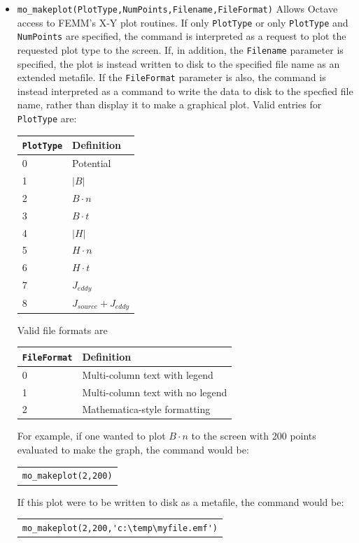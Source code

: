 \begin{itemize}
\item \verb+mo_makeplot(PlotType,NumPoints,Filename,FileFormat)+
Allows Octave access to FEMM's X-Y plot routines.  If only {\tt PlotType} or only {\tt PlotType}
and {\tt NumPoints} are specified, the command is interpreted as a request to plot the
requested plot type to the screen.  If, in addition, the {\tt Filename} parameter is specified,
the plot is instead written to disk to the specified file name as an extended metafile.
If the {\tt FileFormat} parameter is also, the command is instead interpreted as a command to
write the data to disk to the specfied file name, rather than display it to make a
graphical plot.
Valid entries for {\tt PlotType} are:
\begin{center}
\begin{tabular}{ll} \hline
{\tt PlotType} & Definition \\ \hline
0 & Potential \\
1 & $|B|$ \\
2 & $B \cdot n$ \\
3 & $B \cdot t$ \\
4 & $|H|$ \\
5 & $H \cdot n$ \\
6 & $H \cdot t$ \\
7 & $J_{eddy}$ \\
8 & $J_{source}+J_{eddy}$ \\
\hline
\end{tabular}
\end{center}
Valid file formats are
\begin{center}
\begin{tabular}{ll} \hline
{\tt FileFormat} & Definition \\ \hline
0 & Multi-column text with legend \\
1 & Multi-column text with no legend \\
2 & Mathematica-style formatting \\
\hline
\end{tabular}
\end{center}
For example, if one wanted to plot $B \cdot n$ to the screen with 200 points evaluated to
make the graph, the command would be:

\begin{tabular}{l} {\tt mo\_makeplot(2,200)} \end{tabular}

If this plot were to be written to disk as a metafile, the command would be:

\begin{tabular}{l} \verb+mo_makeplot(2,200,'c:\temp\myfile.emf')+ \end{tabular}


\end{itemize}
